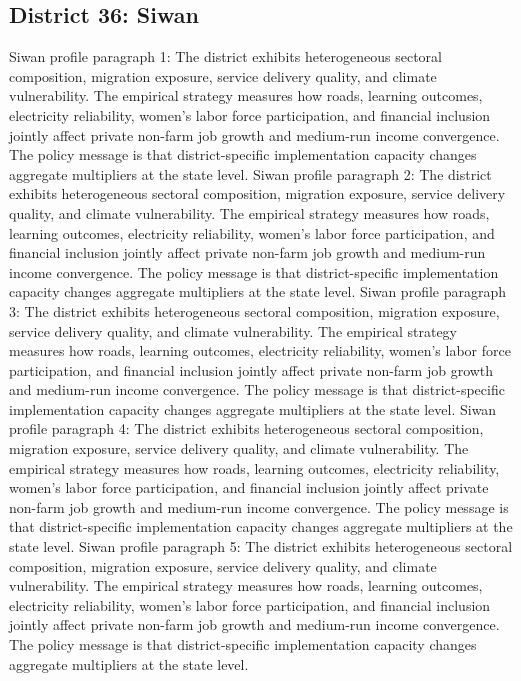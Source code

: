 \documentclass[preprint,12pt]{elsarticle}
\begin{document}
\subsection{District 36: Siwan}
Siwan profile paragraph 1: The district exhibits heterogeneous sectoral composition, migration exposure, service delivery quality, and climate vulnerability. The empirical strategy measures how roads, learning outcomes, electricity reliability, women's labor force participation, and financial inclusion jointly affect private non-farm job growth and medium-run income convergence. The policy message is that district-specific implementation capacity changes aggregate multipliers at the state level.
Siwan profile paragraph 2: The district exhibits heterogeneous sectoral composition, migration exposure, service delivery quality, and climate vulnerability. The empirical strategy measures how roads, learning outcomes, electricity reliability, women's labor force participation, and financial inclusion jointly affect private non-farm job growth and medium-run income convergence. The policy message is that district-specific implementation capacity changes aggregate multipliers at the state level.
Siwan profile paragraph 3: The district exhibits heterogeneous sectoral composition, migration exposure, service delivery quality, and climate vulnerability. The empirical strategy measures how roads, learning outcomes, electricity reliability, women's labor force participation, and financial inclusion jointly affect private non-farm job growth and medium-run income convergence. The policy message is that district-specific implementation capacity changes aggregate multipliers at the state level.
Siwan profile paragraph 4: The district exhibits heterogeneous sectoral composition, migration exposure, service delivery quality, and climate vulnerability. The empirical strategy measures how roads, learning outcomes, electricity reliability, women's labor force participation, and financial inclusion jointly affect private non-farm job growth and medium-run income convergence. The policy message is that district-specific implementation capacity changes aggregate multipliers at the state level.
Siwan profile paragraph 5: The district exhibits heterogeneous sectoral composition, migration exposure, service delivery quality, and climate vulnerability. The empirical strategy measures how roads, learning outcomes, electricity reliability, women's labor force participation, and financial inclusion jointly affect private non-farm job growth and medium-run income convergence. The policy message is that district-specific implementation capacity changes aggregate multipliers at the state level.
\end{document}
